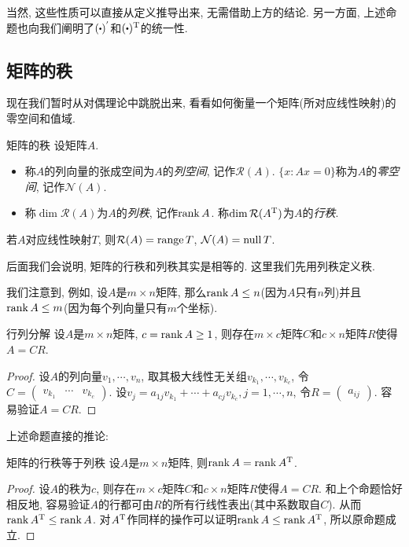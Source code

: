 当然, 这些性质可以直接从定义推导出来, 无需借助上方的结论. 另一方面, 上述命题也向我们阐明了$(\bigcdot)^{'}$和$(\bigcdot)^{\T}$的统一性. 

\subsection{矩阵的秩}

现在我们暂时从对偶理论中跳脱出来, 看看如何衡量一个矩阵(所对应线性映射)的零空间和值域. 

\begin{definition}{矩阵的秩}
	设矩阵$A$. 
	\begin{itemize}
		\item 称$A$的列向量的张成空间为$A$的\textit{列空间}, 记作$\mathcal{R}(A)$. $\{ x:Ax=0 \}$称为$A$的\textit{零空间}, 记作$\mathcal{N}(A)$. 
		\item 称$\dim \mathcal{R}(A)$为$A$的\textit{列秩}, 记作$\operatorname{rank} A$. 称$\dim \mathcal{R}(A^{\operatorname{T}})$为$A$的\textit{行秩}. 
	\end{itemize}
\end{definition}
\begin{remark}
	若$A$对应线性映射$T$, 则$\mathcal{R}(A) = \operatorname{range} T$, $\mathcal{N}(A) = \operatorname{null} T$. 
\end{remark}
\begin{remark}
	后面我们会说明, 矩阵的行秩和列秩其实是相等的. 这里我们先用列秩定义秩. 
\end{remark}

我们注意到, 例如, 设$A$是$m \times n$矩阵, 那么$\operatorname{rank} A \leq n$(因为$A$只有$n$列)并且$\operatorname{rank} A \leq m$(因为每个列向量只有$m$个坐标). 

\begin{proposition}{行列分解}
	设$A$是$m\times n$矩阵, $c=\operatorname{rank} A \geq 1$, 则存在$m\times c$矩阵$C$和$c \times n$矩阵$R$使得$A=CR$. 
\end{proposition}
\begin{proof}
	设$A$的列向量$v_1,\cdots ,v_n$, 取其极大线性无关组$v_{k_1},\cdots ,v_{k_c}$, 令$C=\begin{pmatrix} v_{k_1} & \cdots & v_{k_c} \end{pmatrix}$. 设$v_j = a_{1j}v_{k_1} + \cdots + a_{cj}v_{k_c}, j=1,\cdots ,n$, 令$R = \begin{pmatrix} a_{ij} \end{pmatrix}$. 容易验证$A=CR$. 
\end{proof}

上述命题直接的推论: 

\begin{proposition}{矩阵的行秩等于列秩}
	设$A$是$m\times n$矩阵, 则$\operatorname{rank} A = \operatorname{rank} A^{\operatorname{T}}$. 
\end{proposition}
\begin{proof}
	设$A$的秩为$c$, 则存在$m\times c$矩阵$C$和$c \times n$矩阵$R$使得$A=CR$. 和上个命题恰好相反地, 容易验证$A$的行都可由$R$的所有行线性表出(其中系数取自$C$). 从而$\operatorname{rank} A^{\operatorname{T}} \leq \operatorname{rank} A$. 对$A^{\operatorname{T}}$作同样的操作可以证明$\operatorname{rank} A \leq \operatorname{rank} A^{\operatorname{T}}$, 所以原命题成立. 
\end{proof}

